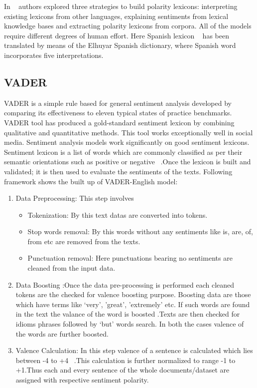 \documentclass[conference]{IEEEtran}
\begin{document}
In ~\cite{b8} authors explored three strategies to build polarity lexicons: interpreting existing lexicons from other languages, explaining sentiments from lexical knowledge bases and extracting polarity lexicons from corpora. All of the models require different degrees of human effort. Here Spanish lexicon ~\cite{b16} has been translated by means of the Elhuyar Spanish dictionary, where Spanish word incorporates five interpretations.

\subsection{VADER}

VADER is a simple rule based for general sentiment analysis developed by comparing its effectiveness to eleven typical states of practice benchmarks. VADER tool has produced a gold-standard sentiment lexicon by combining qualitative and quantitative methods. This tool works exceptionally well in social media. Sentiment analysis models work significantly on good sentiment lexicons. Sentiment lexicon is a list of words which are commonly classified as per their semantic orientations such as positive or negative ~\cite{b17}.Once the lexicon is built and validated; it is then used to evaluate the sentiments of the texts. Following framework shows the built up of VADER-English model:
\begin{enumerate}
    \item Data Preprocessing: This step involves
            \begin {itemize}
            \item Tokenization: By this text datas are converted into tokens.
            \item Stop words removal: By this words without any sentiments like is, are, of, from etc are removed from the texts.
            \item Punctuation removal: Here punctuations bearing no sentiments are cleaned from the input data.
            \end{itemize}
    \item Data Boosting :Once the data pre-processing is performed each cleaned tokens are the checked for valence boosting purpose. Boosting data are those which have terms like ‘very’, ’great’, ’extremely’ etc. If such words are found in the text the valance of the word is boosted .Texts are then checked for idioms phrases followed by ‘but’ words search. In both the cases valence of the words are further boosted.
    \item Valence Calculation: In this step valence of a sentence is calculated which lies between -4 to +4 ~\cite{b3}.This calculation is further normalized to range -1 to +1.Thus each and every sentence of the whole documents/dataset are assigned with respective sentiment polarity. 
\end{enumerate}
\end{document}

